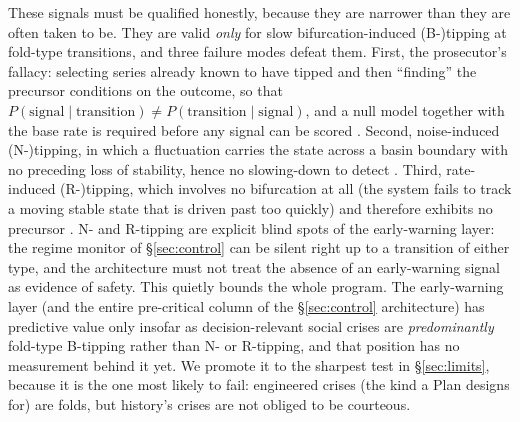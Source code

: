 \documentclass[11pt]{article}
\begin{document}
These signals must be qualified honestly, because they are narrower than they are often taken to be. They are valid \emph{only} for slow bifurcation-induced (B-)tipping at fold-type transitions, and three failure modes defeat them. First, the prosecutor's fallacy: selecting series already known to have tipped and then ``finding'' the precursor conditions on the outcome, so that $P(\text{signal}\mid\text{transition}) \neq P(\text{transition}\mid\text{signal})$, and a null model together with the base rate is required before any signal can be scored \cite{boettiger2012}. Second, noise-induced (N-)tipping, in which a fluctuation carries the state across a basin boundary with no preceding loss of stability, hence no slowing-down to detect \cite{boettiger2013}. Third, rate-induced (R-)tipping, which involves no bifurcation at all (the system fails to track a moving stable state that is driven past too quickly) and therefore exhibits no precursor \cite{ashwin2012}. N- and R-tipping are explicit blind spots of the early-warning layer: the regime monitor of \S\ref{sec:control} can be silent right up to a transition of either type, and the architecture must not treat the absence of an early-warning signal as evidence of safety. This quietly bounds the whole program. The early-warning layer (and the entire pre-critical column of the \S\ref{sec:control} architecture) has predictive value only insofar as decision-relevant social crises are \emph{predominantly} fold-type B-tipping rather than N- or R-tipping, and that position has no measurement behind it yet. We promote it to the sharpest test in \S\ref{sec:limits}, because it is the one most likely to fail: engineered crises (the kind a Plan designs for) are folds, but history's crises are not obliged to be courteous.
\end{document}

